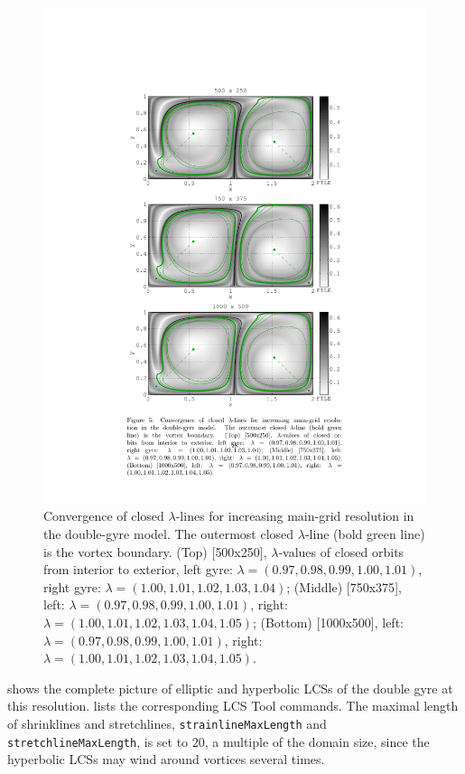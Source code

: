 \documentclass{elsarticle}
\begin{document}
\begin{figure}[hbt]
\centering
\includegraphics[width=.8\textwidth]{graphics/double_gyre/lambda_lcs_convergence}\caption{Convergence of closed $\lambda$-lines for increasing main-grid resolution in the double-gyre model. The outermost closed $\lambda$-line (bold green line) is the vortex boundary. (Top) {[}500x250{]}, $\lambda$-values
of closed orbits from interior to exterior, left gyre: $\lambda=(0.97, 0.98, 0.99, 1.00, 1.01)$, right gyre: $\lambda=(1.00, 1.01, 1.02, 1.03, 1.04)$; (Middle) {[}750x375{]}, left: $\lambda=(0.97, 0.98, 0.99, 1.00, 1.01)$, right: $\lambda=(1.00, 1.01, 1.02, 1.03, 1.04, 1.05)$; (Bottom) {[}1000x500{]}, left: $\lambda=(0.97, 0.98, 0.99, 1.00, 1.01)$, right: $\lambda=(1.00, 1.01, 1.02, 1.03, 1.04, 1.05)$.}
\label{f:double gyre lambda LCS convergence}
\end{figure}

 shows the complete picture of elliptic and hyperbolic LCSs of the double gyre at this resolution.  lists the corresponding LCS Tool commands. The maximal length of shrinklines and stretchlines, \lstinline!strainlineMaxLength! and \lstinline!stretchlineMaxLength!, is set to $20$, a multiple of the domain size, since the hyperbolic LCSs may wind around vortices several times. 
\end{document}
